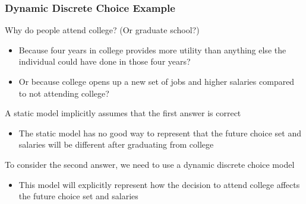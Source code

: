 \documentclass{beamer}
\begin{document}
\begin{frame}\frametitle{Dynamic Discrete Choice Example}
    Why do people attend college? (Or graduate school?)
    \begin{itemize}
        \item Because four years in college provides more utility than anything else the individual could have done in those four years?
        \item Or because college opens up a new set of jobs and higher salaries compared to not attending college?
    \end{itemize}
    \vspace{3ex}
    A static model implicitly assumes that the first answer is correct
    \begin{itemize}
        \item The static model has no good way to represent that the future choice set and salaries will be different after graduating from college
    \end{itemize}
    \vspace{3ex}
    To consider the second answer, we need to use a dynamic discrete choice model
    \begin{itemize}
        \item This model will explicitly represent how the decision to attend college affects the future choice set and salaries
    \end{itemize}
\end{frame}
\end{document}
